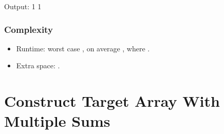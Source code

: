 \documentclass[letterpaper,12pt,english]{book}
\begin{document}
\begin{sphinxVerbatim}[commandchars=\\\{\}]
\end{sphinxVerbatim}

\begin{sphinxVerbatim}[commandchars=\\\{\}]
Output:
1
1
\end{sphinxVerbatim}


\subsubsection{Complexity}
\label{\detokenize{Priority_Queue/1046_Last_Stone_Weight:complexity}}\begin{itemize}
\item {} 
\sphinxAtStartPar
Runtime: worst case , on average , where .

\item {} 
\sphinxAtStartPar
Extra space: .

\end{itemize}

\sphinxstepscope


\section{Construct Target Array With Multiple Sums}
\label{\detokenize{Priority_Queue/1354_Construct_Target_Array_With_Multiple_Sums:construct-target-array-with-multiple-sums}}\label{\detokenize{Priority_Queue/1354_Construct_Target_Array_With_Multiple_Sums::doc}}
\end{document}
